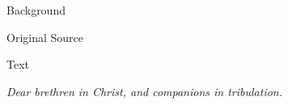 				\begin{description}
					\item[Background]
				\end{description}
				
				
				\begin{description}
					\item[Original Source]
				\end{description}
				
				
				\begin{description}
					\item[Text]
				\end{description}
					
					
					\begin{tightright}
						\textit{Dear brethren in Christ, and companions in tribulation.}
					\end{tightright}
					
